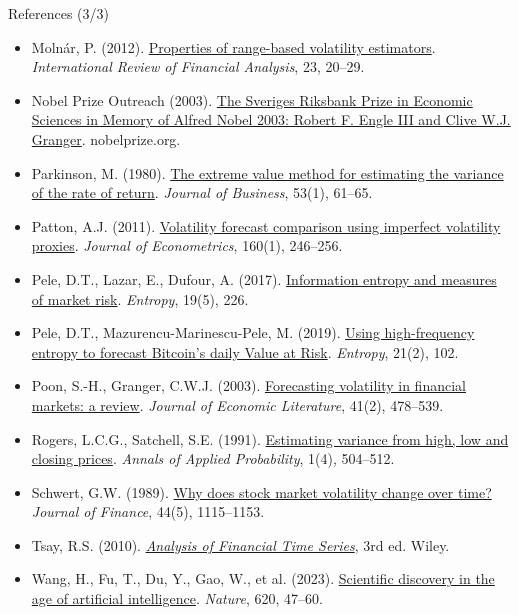 \begin{frame}{References (3/3)}
\itemsize{\tiny}
\begin{itemize}
    \item Molnár, P. (2012). \href{https://doi.org/10.1016/j.irfa.2011.06.012}{Properties of range-based volatility estimators}. \textit{International Review of Financial Analysis}, 23, 20--29.
    \item Nobel Prize Outreach (2003). \href{https://www.nobelprize.org/prizes/economic-sciences/2003/summary/}{The Sveriges Riksbank Prize in Economic Sciences in Memory of Alfred Nobel 2003: Robert F. Engle III and Clive W.J. Granger}. nobelprize.org.
    \item Parkinson, M. (1980). \href{https://doi.org/10.1086/296071}{The extreme value method for estimating the variance of the rate of return}. \textit{Journal of Business}, 53(1), 61--65.
    \item Patton, A.J. (2011). \href{https://doi.org/10.1016/j.jeconom.2010.03.034}{Volatility forecast comparison using imperfect volatility proxies}. \textit{Journal of Econometrics}, 160(1), 246--256.
    \item Pele, D.T., Lazar, E., Dufour, A. (2017). \href{https://doi.org/10.3390/e19050226}{Information entropy and measures of market risk}. \textit{Entropy}, 19(5), 226.
    \item Pele, D.T., Mazurencu-Marinescu-Pele, M. (2019). \href{https://doi.org/10.3390/e21020102}{Using high-frequency entropy to forecast Bitcoin's daily Value at Risk}. \textit{Entropy}, 21(2), 102.
    \item Poon, S.-H., Granger, C.W.J. (2003). \href{https://doi.org/10.1257/002205103765762743}{Forecasting volatility in financial markets: a review}. \textit{Journal of Economic Literature}, 41(2), 478--539.
    \item Rogers, L.C.G., Satchell, S.E. (1991). \href{https://doi.org/10.1214/aoap/1177005835}{Estimating variance from high, low and closing prices}. \textit{Annals of Applied Probability}, 1(4), 504--512.
    \item Schwert, G.W. (1989). \href{https://doi.org/10.1111/j.1540-6261.1989.tb02647.x}{Why does stock market volatility change over time?} \textit{Journal of Finance}, 44(5), 1115--1153.
    \item Tsay, R.S. (2010). \href{https://doi.org/10.1002/9780470644560}{\textit{Analysis of Financial Time Series}}, 3rd ed. Wiley.
    \item Wang, H., Fu, T., Du, Y., Gao, W., et al. (2023). \href{https://doi.org/10.1038/s41586-023-06221-2}{Scientific discovery in the age of artificial intelligence}. \textit{Nature}, 620, 47--60.

\end{itemize}
\end{frame}
